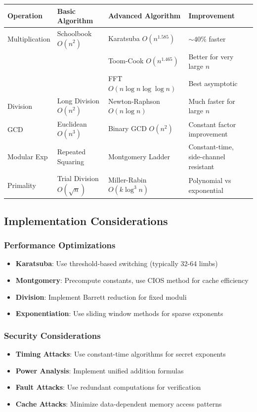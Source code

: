 \documentclass[12pt,a4paper]{article}
\theoremstyle{definition}
\begin{document}
\begin{table}[H]
\centering
\begin{tabular}{|l|l|l|l|}
\hline
\textbf{Operation} & \textbf{Basic Algorithm} & \textbf{Advanced Algorithm} & \textbf{Improvement} \\
\hline
Multiplication & Schoolbook $O(n^2)$ & Karatsuba $O(n^{1.585})$ & $\sim 40\%$ faster \\
& & Toom-Cook $O(n^{1.465})$ & Better for very large $n$ \\
& & FFT $O(n \log n \log\log n)$ & Best asymptotic \\
\hline
Division & Long Division $O(n^2)$ & Newton-Raphson $O(n \log n)$ & Much faster for large $n$ \\
\hline
GCD & Euclidean $O(n^3)$ & Binary GCD $O(n^2)$ & Constant factor improvement \\
\hline
Modular Exp & Repeated Squaring & Montgomery Ladder & Constant-time, side-channel resistant \\
\hline
Primality & Trial Division $O(\sqrt{n})$ & Miller-Rabin $O(k \log^3 n)$ & Polynomial vs exponential \\
\hline
\end{tabular}
\end{table}

\subsection{Implementation Considerations}

\subsubsection{Performance Optimizations}
\begin{itemize}
    \item \textbf{Karatsuba}: Use threshold-based switching (typically 32-64 limbs)
    \item \textbf{Montgomery}: Precompute constants, use CIOS method for cache efficiency
    \item \textbf{Division}: Implement Barrett reduction for fixed moduli
    \item \textbf{Exponentiation}: Use sliding window methods for sparse exponents
\end{itemize}

\subsubsection{Security Considerations}
\begin{itemize}
    \item \textbf{Timing Attacks}: Use constant-time algorithms for secret exponents
    \item \textbf{Power Analysis}: Implement unified addition formulas
    \item \textbf{Fault Attacks}: Use redundant computations for verification
    \item \textbf{Cache Attacks}: Minimize data-dependent memory access patterns
\end{itemize}
\end{document}
